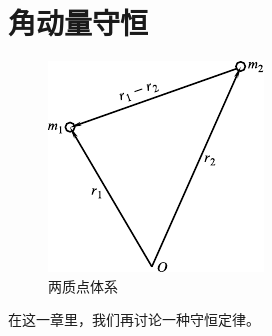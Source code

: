 \section{角动量守恒}

\begin{figure}
  \vspace{-4em}
  \centering
  \includegraphics{figure/fig09.01}
  \caption{两质点体系}
  \label{fig:09.01}
\end{figure}
在这一章里，我们再讨论一种守恒定律。

